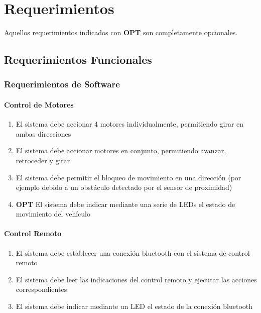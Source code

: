 \chapter{Requerimientos}

\vspace{12pt}
Aquellos requerimientos indicados con \textbf{OPT} son completamente opcionales.

\section{Requerimientos Funcionales}

\subsection{Requerimientos de Software}

\subsubsection{Control de Motores}

\begin{enumerate}
	\item El sistema debe accionar 4 motores individualmente, permitiendo girar en ambas direcciones
	\item El sistema debe accionar motores en conjunto, permitiendo avanzar, retroceder y girar
	\item El sistema debe permitir el bloqueo de movimiento en una dirección (por ejemplo debido a un obstáculo detectado por el sensor de proximidad)
	\item \textbf{OPT} El sistema debe indicar mediante una serie de LEDs el estado de movimiento del vehículo
\end{enumerate}

\subsubsection{Control Remoto}

\begin{enumerate}
	\item El sistema debe  establecer una conexión bluetooth con el sistema de control remoto
	\item El sistema debe leer las indicaciones del control remoto y ejecutar las acciones correspondientes
	\item El sistema debe indicar mediante un LED el estado de la conexión bluetooth
\end{enumerate}

